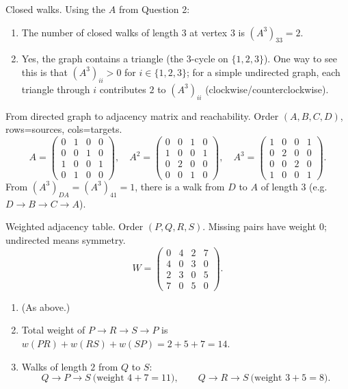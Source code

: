 \documentclass[11pt]{article}
\def\textbf#1{#1}%
\begin{document}
\begin{solution}
\textbf{Closed walks.}
Using the $A$ from Question 2:
\begin{enumerate}
  \item The number of closed walks of length $3$ at vertex $3$ is $(A^3)_{33}=2$.
  \item Yes, the graph contains a triangle (the $3$-cycle on $\{1,2,3\}$). One way to see this is that $(A^3)_{ii}>0$ for $i\in\{1,2,3\}$; for a simple undirected graph, each triangle through $i$ contributes $2$ to $(A^3)_{ii}$ (clockwise/counterclockwise).
\end{enumerate}
\end{solution}

\begin{solution}
\textbf{From directed graph to adjacency matrix and reachability.}
Order $(A,B,C,D)$, rows=sources, cols=targets.
\[
A=\begin{pmatrix}
0&1&0&0\\
0&0&1&0\\
1&0&0&1\\
0&1&0&0
\end{pmatrix},\quad
A^2=\begin{pmatrix}
0&0&1&0\\
1&0&0&1\\
0&2&0&0\\
0&0&1&0
\end{pmatrix},\quad
A^3=\begin{pmatrix}
1&0&0&1\\
0&2&0&0\\
0&0&2&0\\
1&0&0&1
\end{pmatrix}.
\]
From $(A^3)_{DA}=(A^3)_{41}=1$, there is a walk from $D$ to $A$ of length $3$ (e.g.\ $D\!\to\!B\!\to\!C\!\to\!A$).
\end{solution}

\begin{solution}
\textbf{Weighted adjacency table.}
Order $(P,Q,R,S)$. Missing pairs have weight $0$; undirected means symmetry.
\[
W=\begin{pmatrix}
0&4&2&7\\
4&0&3&0\\
2&3&0&5\\
7&0&5&0
\end{pmatrix}.
\]
\begin{enumerate}
  \item (As above.)
  \item Total weight of $P\!\to\!R\!\to\!S\!\to\!P$ is $w(PR)+w(RS)+w(SP)=2+5+7=14$.
  \item Walks of length $2$ from $Q$ to $S$:
  \[
  Q\!\to\!P\!\to\!S\ \text{(weight }4+7=11),\qquad
  Q\!\to\!R\!\to\!S\ \text{(weight }3+5=8).
  \]
\end{enumerate}
\end{solution}
\end{document}
